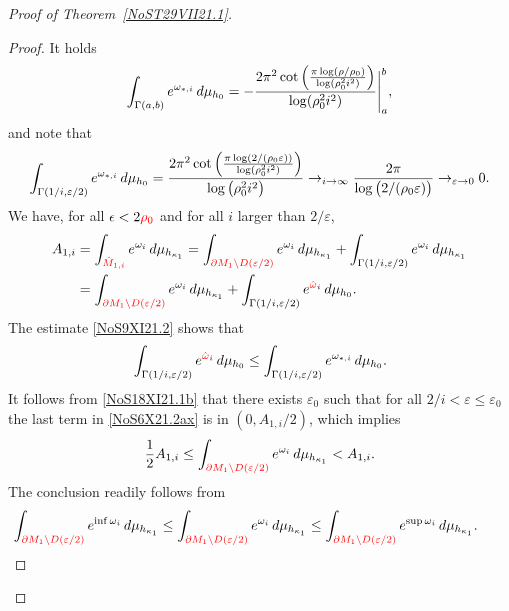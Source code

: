 \documentclass[10pt,a4paper]{article}
\numberwithin{equation}{section}
\newcommand{\hmv}{\red{\hat \omega}}
\newcommand{\mv}{\omega}%
\renewcommand{\qed}{}
\newcommand{\red}[1]{{\color{red}#1}}
\newcommand{\repsilon}{ {\varepsilon}}
\newcommand{\rhozero}{\red{\rho_0}}
\newcommand{\zMone}{\red{{\hat M}_{1,i}}}
\begin{document}
\begin{proof}[Proof of Theorem~\ref{NoST29VII21.1}]
\begin{proof}
It holds
\begin{equation*}%
 \int_{\Gamma(a,b)} {\rm e}^{\mv_{*,i} }\,{\rm d}\mu_{h_0}
 = -\frac{2 \pi ^2 \cot \Big(\frac{\pi
 \log (\rho/\rho_0 )}{\log
(\rho_0^2i^2)}\Big)}{\log
(\rho_0^2i^2)}\Bigg|^b_a,
\end{equation*}
and note that
\begin{equation}\label{NoS18XI21.1b}
 \int_{\Gamma(1/i,\repsilon/2)} {\rm e}^{\mv_{*,i} }\, {\rm d}\mu_{h_0}
 = \frac{2 \pi ^2 \cot \Big(\frac{\pi
 \log (2/(\rho_0\repsilon))}{\log
 (\rho_0^2i^2)}\Big)}{\log
 \big(\rho_0^2i^2\big)}
 \to_{i\to\infty}
 \frac{2\pi }{\log \big(2/(\rho_0\repsilon)\big)}
 \to_{\repsilon\to 0} 0.
\end{equation}
We have, for all $\epsilon< 2\rhozero$ and for all $i$ larger than $2/\repsilon$,
\begin{align}
 A_{1,i}
 &=
 \int_{\zMone} {\rm e}^{\mv_i} \,{\rm d}\mu_{h_{\kappa_1}}= \int_{\red {\partial M_1 \setminus D(\repsilon/2)}} {\rm e}^{\mv_i}\, {\rm d}\mu_{h_{\kappa_1}}
 +
 \int_{\Gamma(1/i,\repsilon/2) } {\rm e}^{\mv_i}\, {\rm d}\mu_{h_{\kappa_1}}
 \nonumber
\\
 &=
 \int_{\red{\partial M_1 \setminus D(\repsilon/2)}} {\rm e}^{\mv_i}\, {\rm d}\mu_{h_{\kappa_1}}
 +
 \int_{\Gamma(1/i,\repsilon/2) } {\rm e}^{\hmv_i}\, {\rm d}\mu_{h_{0}}.\label{NoS6X21.2ax}
\end{align}
The estimate \eqref{NoS9XI21.2} shows that
\begin{gather*}
\int_{\Gamma(1/i,\repsilon/2) } {\rm e}^{\hmv_i} \,{\rm d}\mu_{h_0}
 \le
 \int_{\Gamma(1/i,\repsilon/2) } {\rm e}^{\mv_{*,i} }\, {\rm d}\mu_{h_0}. %
\end{gather*}
It follows from \eqref{NoS18XI21.1b} that there exists $\repsilon_0$ such that for all $2/{i} <\repsilon\le \repsilon_0$ the last term in \eqref{NoS6X21.2ax} is in $(0,A_{1,i}/2)$,
which implies
\begin{eqnarray*}
 \frac 12 A_{1,i} \le \int_{\red{\partial M_1 \setminus D(\repsilon/2)}} {\rm e}^{\mv_i} \,{\rm d}\mu_{h_{\kappa_1}}
 < A_{1,i}. %
\end{eqnarray*}
The conclusion readily follows from
\begin{gather*}
 \int_{\red{\partial M_1 \setminus D(\repsilon/2)}} {\rm e}^{\inf \mv_i }\, {\rm d}\mu_{h_{\kappa_1} }
 \le \int_{\red{\partial M_1 \setminus D(\repsilon/2)}} {\rm e}^{\mv_i} \,{\rm d}\mu_{h_{\kappa_1} }
 \le \int_{\red{\partial M_1 \setminus D(\repsilon/2)}} {\rm e}^{\sup \mv_i} \,{\rm d}\mu_{h_{\kappa_1}}.
 \tag*{\qed}
\end{gather*}
\renewcommand{\qed}{}
\end{proof}


\end{proof}
\end{document}

